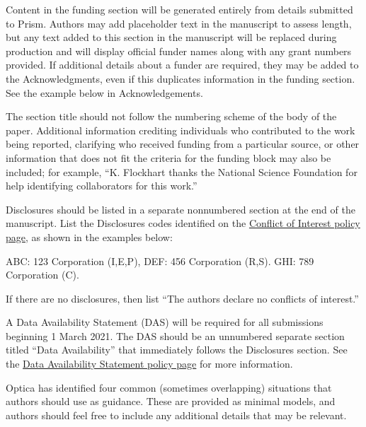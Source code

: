 \documentclass{../packages/optica-article}
\begin{document}
\begin{backmatter}
	Content in the funding section will be generated entirely from details submitted to Prism. Authors may add placeholder text in the manuscript to assess length, but any text added to this section in the manuscript will be replaced during production and will display official funder names along with any grant numbers provided. If additional details about a funder are required, they may be added to the Acknowledgments, even if this duplicates information in the funding section. See the example below in Acknowledgements.

	The section title should not follow the numbering scheme of the body of the paper. Additional information crediting individuals who contributed to the work being reported, clarifying who received funding from a particular source, or other information that does not fit the criteria for the funding block may also be included; for example, ``K. Flockhart thanks the National Science Foundation for help identifying collaborators for this work.''

	Disclosures should be listed in a separate nonnumbered section at the end of the manuscript. List the Disclosures codes identified on the \href{https://opg.optica.org/submit/review/conflicts-interest-policy.cfm}{Conflict of Interest policy page}, as shown in the examples below:

	\medskip

	\noindent ABC: 123 Corporation (I,E,P), DEF: 456 Corporation (R,S). GHI: 789 Corporation (C).

	\medskip

	\noindent If there are no disclosures, then list ``The authors declare no conflicts of interest.''


	A Data Availability Statement (DAS) will be required for all submissions beginning 1 March 2021. The DAS should be an unnumbered separate section titled ``Data Availability'' that
	immediately follows the Disclosures section. See the \href{https://opg.optica.org/submit/review/data-availability-policy.cfm}{Data Availability Statement policy page} for more information.

	Optica has identified four common (sometimes overlapping) situations that authors should use as guidance. These are provided as minimal models, and authors should feel free to
	include any additional details that may be relevant.


\end{backmatter}
\end{document}
